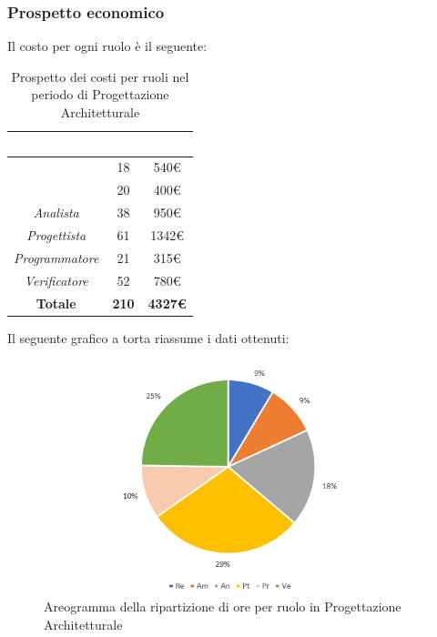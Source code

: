 \subsubsection{Prospetto economico}
Il costo per ogni ruolo è il seguente:
\begin{table}[H]
	\begin{center}
		\begin{tabular}{ |c c c| }
		\rowcolor{darkblue} 
		\textcolor{white}{\textbf{Ruolo}} & \textcolor{white}{\textbf{Ore}} & \textcolor{white}{\textbf{Costo}} \\ \hline
		\textit{\Responsabile} 		& 18 & 540€ \\ \hline
		\textit{\Amministratore} 	& 20 & 400€ \\ \hline
		\textit{Analista} 			& 38 & 950€ \\ \hline
		\textit{Progettista} 		& 61 & 1342€\\ \hline
		\textit{Programmatore}  	& 21 & 315€ \\ \hline
		\textit{Verificatore} 		& 52 & 780€ \\ \hline
		\textbf{Totale} & \textbf{210} & \textbf{4327€} \\ \hline
		\end{tabular}
	\caption{ Prospetto dei costi per ruoli nel periodo di Progettazione Architetturale}
	\end{center}
\end{table}
Il seguente grafico a torta riassume i dati ottenuti:
\begin{figure}[H]
    \centering
    \includegraphics[scale = 0.75]{Immagini/ArchitetturaTorta.png}
    \caption{Areogramma della ripartizione di ore per ruolo in Progettazione Architetturale}
    \label{fig:Areogramma ripartizione ore, periodo di Progettazione Architetturale}
\end{figure}
\newpage

